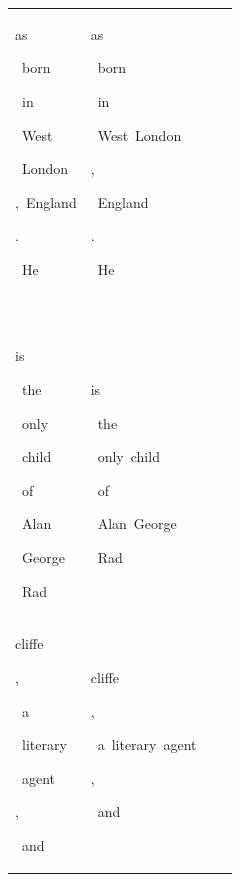\begin{table}[h]
\begin{tabular}{ l l l l }
 \colorbox{cm_34!40}{\strut as}\colorbox{cm_32!40}{\strut \ born}\colorbox{cm_33!40}{\strut \ in}\colorbox{cm_23!40}{\strut \ West}\colorbox{cm_20!40}{\strut \ London}\colorbox{cm_32!40}{\strut ,\ England}\colorbox{cm_14!40}{\strut .}\colorbox{cm_22!40}{\strut \ He}\colorbox{cm_59!40}{\strut \ } & \colorbox{cm_12!40}{\strut as}\colorbox{cm_0!40}{\strut \ born}\colorbox{cm_12!40}{\strut \ in}\colorbox{cm_0!40}{\strut \ West\ London}\colorbox{cm_12!40}{\strut ,}\colorbox{cm_0!40}{\strut \ England}\colorbox{cm_12!40}{\strut .}\colorbox{cm_25!40}{\strut \ He}\colorbox{cm_0!40}{\strut \ } &  &  \\ 
 \colorbox{cm_59!40}{\strut is}\colorbox{cm_34!40}{\strut \ the}\colorbox{cm_52!40}{\strut \ only}\colorbox{cm_28!40}{\strut \ child}\colorbox{cm_31!40}{\strut \ of}\colorbox{cm_18!40}{\strut \ Alan}\colorbox{cm_24!40}{\strut \ George}\colorbox{cm_33!40}{\strut \ Rad} & \colorbox{cm_0!40}{\strut is}\colorbox{cm_12!40}{\strut \ the}\colorbox{cm_0!40}{\strut \ only\ child}\colorbox{cm_12!40}{\strut \ of}\colorbox{cm_0!40}{\strut \ Alan\ George}\colorbox{cm_12!40}{\strut \ Rad} &  &  \\ 
 \colorbox{cm_31!40}{\strut cliffe}\colorbox{cm_26!40}{\strut ,}\colorbox{cm_31!40}{\strut \ a}\colorbox{cm_43!40}{\strut \ literary}\colorbox{cm_34!40}{\strut \ agent}\colorbox{cm_29!40}{\strut ,}\colorbox{cm_31!40}{\strut \ and} & \colorbox{cm_25!40}{\strut cliffe}\colorbox{cm_12!40}{\strut ,}\colorbox{cm_0!40}{\strut \ a\ literary\ agent}\colorbox{cm_12!40}{\strut ,}\colorbox{cm_25!40}{\strut \ and} &  &  \\ 
  \bottomrule 
  \end{tabular}
    \label{tab:data_wiki103_radclif}
\end{table}
